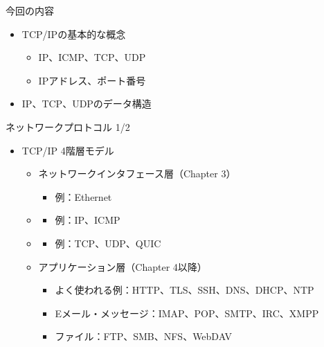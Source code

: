 \documentclass[12pt,aspectratio=169]{beamer}
\begin{document}
\begin{frame}{今回の内容}

  \begin{itemize}
    \item TCP/IPの基本的な概念
      \begin{itemize}
        \item IP、ICMP、TCP、UDP
        \item IPアドレス、ポート番号
      \end{itemize}
    \item IP、TCP、UDPのデータ構造
  \end{itemize}

\end{frame}


\begin{frame}{ネットワークプロトコル 1/2}

  \begin{itemize}
    \item TCP/IP 4階層モデル
      \begin{itemize}
        \item ネットワークインタフェース層（Chapter 3）
          \begin{itemize}
            \item 例：Ethernet
          \end{itemize}
        \item {}
          \begin{itemize}
            \item 例：IP、ICMP
          \end{itemize}
        \item {}
          \begin{itemize}
            \item 例：TCP、UDP、QUIC
          \end{itemize}
        \item アプリケーション層（Chapter 4以降）
          \begin{itemize}
            \item よく使われる例：HTTP、TLS、SSH、DNS、DHCP、NTP
            \item Eメール・メッセージ：IMAP、POP、SMTP、IRC、XMPP
            \item ファイル：FTP、SMB、NFS、WebDAV
          \end{itemize}

      \end{itemize}

  \end{itemize}

\end{frame}
\end{document}

